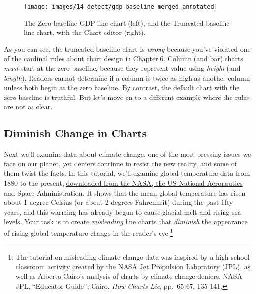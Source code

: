 \documentclass[
  english,
]{book}
\begin{document}
\begin{figure}
\texttt{[image: images/14-detect/gdp-baseline-merged-annotated]} \caption{The Zero baseline GDP line chart (left), and the Truncated baseline line chart, with the Chart editor (right).}\label{fig:gdp-baseline-merged}
\end{figure}

As you can see, the truncated baseline chart is \emph{wrong} because you've violated one of the \href{chart-design.html}{cardinal rules about chart design in Chapter 6}. Column (and bar) charts \emph{must} start at the zero baseline, because they represent value using \emph{height} (and \emph{length}). Readers cannot determine if a column is twice as high as another column unless both begin at the zero baseline. By contrast, the default chart with the zero baseline is truthful. But let's move on to a different example where the rules are not as clear.

\hypertarget{diminish-change-in-charts}{%
\subsection*{Diminish Change in Charts}\label{diminish-change-in-charts}}

Next we'll examine data about climate change, one of the most pressing issues we face on our planet, yet deniers continue to resist the new reality, and some of them twist the facts. In this tutorial, we'll examine global temperature data from 1880 to the present, \href{https://climate.nasa.gov/vital-signs/global-temperature/}{downloaded from the NASA, the US National Aeronautics and Space Administration}. It shows that the mean global temperature has risen about 1 degree Celsius (or about 2 degrees Fahrenheit) during the past fifty years, and this warming has already begun to cause glacial melt and rising sea levels. Your task is to create \emph{misleading} line charts that \emph{diminish} the appearance of rising global temperature change in the reader's eye.\footnote{The tutorial on misleading climate change data was inspired by a high school classroom activity created by the NASA Jet Propulsion Laboratory (JPL), as well as Alberto Cairo's analysis of charts by climate change deniers. NASA JPL, {``Educator {Guide}''}; Cairo, \emph{How {Charts Lie}}, pp.~65-67, 135-141.}
\end{document}
